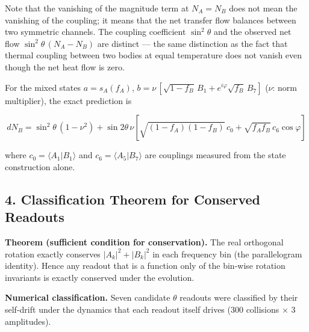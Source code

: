 \documentclass[
  a4paper,
]{article}
\begin{document}
Note that the vanishing of the magnitude term at \(N_A=N_B\) does not
mean the vanishing of the coupling; it means that the net transfer flow
balances between two symmetric channels. The coupling coefficient
\(\sin^2\theta\) and the observed net flow \(\sin^2\theta\,(N_A-N_B)\)
are distinct --- the same distinction as the fact that thermal coupling
between two bodies at equal temperature does not vanish even though the
net heat flow is zero.

For the mixed states \(a=s_A(f_A)\),
\(b=\nu\,[\sqrt{1-f_B}\,B_1+e^{i\varphi}\sqrt{f_B}\,B_7]\) (\(\nu\):
norm multiplier), the exact prediction is

\[
dN_B
=\sin^2\theta\,(1-\nu^2)
+\sin2\theta\,\nu\!\left[\sqrt{(1-f_A)(1-f_B)}\,c_0
+\sqrt{f_Af_B}\,c_6\cos\varphi\right]
\]

where \(c_0=\langle A_1|B_1\rangle\) and \(c_6=\langle A_5|B_7\rangle\)
are couplings measured from the state construction alone.

\subsection{4. Classification Theorem for Conserved
Readouts}\label{classification-theorem-for-conserved-readouts}

\textbf{Theorem (sufficient condition for conservation).} The real
orthogonal rotation exactly conserves \(|A_k|^2+|B_k|^2\) in each
frequency bin (the parallelogram identity). Hence any readout that is a
function only of the bin-wise rotation invariants is exactly conserved
under the evolution.

\textbf{Numerical classification.} Seven candidate \(\theta\) readouts
were classified by their self-drift under the dynamics that each readout
itself drives (300 collisions × 3 amplitudes).
\end{document}
